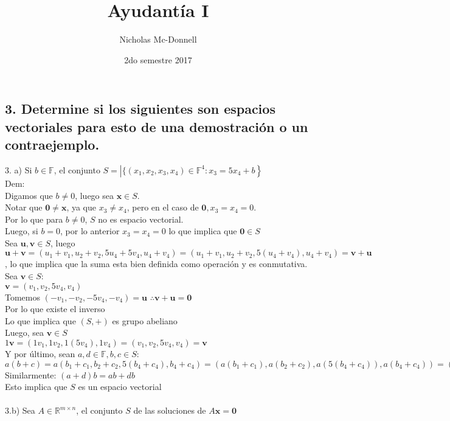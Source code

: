 \documentclass[11pt]{article}
\title{Ayudantía I}
\author{Nicholas Mc-Donnell}
\date{2do semestre 2017}
\renewcommand{\vec}[1]{\mathbf{#1}}
\begin{document}
\maketitle

\subsection*{3. Determine si los siguientes son espacios vectoriales para esto de una demostración o un contraejemplo.}

3. a) Si $b\in\mathbb{F}$, el conjunto $S=\left|\{(x_1,x_2,x_3,x_4)\in\mathbb{F}^4:x_3=5x_4+b\right\}$\\
Dem:\\
Digamos que $b\neq 0$, luego sea $\vec{x}\in S$.\\
Notar que $\vec{0}\neq\vec{x}$, ya que $x_3\neq x_4$, pero en el caso de $\vec{0},x_3=x_4=0$.\\
Por lo que para $b\neq 0$, $S$ no es espacio vectorial.\\
Luego, si $b=0$, por lo anterior $x_3=x_4=0$ lo que implica que $\vec{0}\in S$\\
Sea $\vec{u},\vec{v}\in S$, luego $\vec{u}+\vec{v}=(u_1+v_1,u_2+v_2,5u_4+5v_4,u_4+v_4)=(u_1+v_1,u_2+v_2,5(u_4+v_4),u_4+v_4)=\vec{v}+\vec{u}$, lo que implica que la suma esta bien definida como operación y es conmutativa.\\
Sea $\vec{v}\in S$:\\
$\vec{v}=(v_1,v_2,5v_4,v_4)$\\
Tomemos $(-v_1,-v_2,-5v_4,-v_4)=\vec{u}$
$\therefore \vec{v}+\vec{u}=\vec{0}$\\
Por lo que existe el inverso\\
Lo que implica que $(S,+)$ es grupo abeliano\\
Luego, sea $\vec{v}\in S$\\
$1\vec{v}=(1v_1,1v_2,1(5v_4),1v_4)=(v_1,v_2,5v_4,v_4)=\vec{v}$\\
Y por último, sean $a,d\in \mathbb{F}, b,c\in S$:\\
$a(b+c)=a(b_1+c_1,b_2+c_2,5(b_4+c_4),b_4+c_4)=(a(b_1+c_1),a(b_2+c_2),a(5(b_4+c_4)),a(b_4+c_4))=(ab_1+ac_1,ab_2+ac_2,5(ab_4+ac_4),ab_4+ac_4)=ab+ac$\\
Similarmente: $(a+d)b=ab+db$\\
Esto implica que $S$ es un espacio vectorial\\
\\
3.b) Sea $A\in\mathbb{R}^{m\times n}$, el conjunto $S$ de las soluciones de $A\vec{x}=\vec{0}$\\
\end{document}
